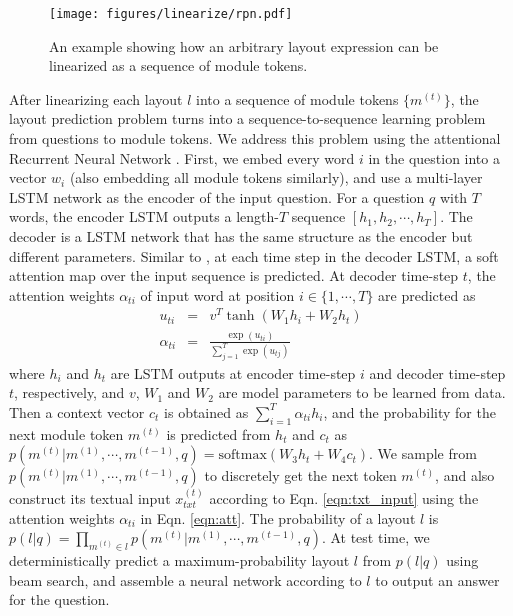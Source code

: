 \documentclass[10pt,twocolumn,letterpaper]{article}
\begin{document}
\begin{figure}[t]
\centering
\texttt{[image: figures/linearize/rpn.pdf]}\vspace{-0.2cm}
\caption{An example showing how an arbitrary layout expression can be linearized as a sequence of module tokens.}
\label{fig:linearize}
\vspace{-0.5cm}
\end{figure}

After linearizing each layout $l$ into a sequence of module tokens $\{m^{(t)}\}$, the layout prediction problem turns into a sequence-to-sequence learning problem from questions to module tokens. We address this problem using the attentional Recurrent Neural Network \cite{bahdanau2015neural}. First, we embed every word $i$ in the question into a vector $w_i$ (also embedding all module tokens similarly), and use a multi-layer LSTM network as the encoder of the input question. For a question $q$ with $T$ words, the encoder LSTM outputs a length-$T$ sequence $[h_1, h_2, \cdots, h_{T}]$. The decoder is a LSTM network that has the same structure as the encoder but different parameters. Similar to \cite{bahdanau2015neural}, at each time step in the decoder LSTM, a soft attention map over the input sequence is predicted. At decoder time-step $t$, the attention weights $\alpha_{ti}$ of input word at position $i \in \{1, \cdots, T\}$ are predicted as
\begin{eqnarray}
u_{ti} &=& v^T \tanh(W_1 h_i + W_2 h_t) \\
\alpha_{ti} &=& \frac{\exp(u_{ti})}{\sum_{j=1}^{T} \exp(u_{tj})} \label{eqn:att}
\end{eqnarray}
where $h_i$ and $h_t$ are LSTM outputs at encoder time-step $i$ and decoder time-step $t$, respectively, and $v$, $W_1$ and $W_2$ are model parameters to be learned from data. Then a context vector $c_t$ is obtained as $\sum_{i=1}^{T} \alpha_{ti} h_i$, and the probability for the next module token $m^{(t)}$ is predicted from $h_t$ and $c_t$ as
$
p(m^{(t)} | m^{(1)}, \cdots, m^{(t-1)}, q) = \mathrm{softmax}(W_3 h_t + W_4 c_t)
$.
We sample from $p(m^{(t)} | m^{(1)}, \cdots, m^{(t-1)}, q)$ to discretely get the next token $m^{(t)}$, and also construct its textual input $x_{txt}^{(t)}$ according to Eqn. \ref{eqn:txt_input} using the attention weights $\alpha_{ti}$ in Eqn. \ref{eqn:att}. The probability of a layout $l$ is
$
p(l | q) = \prod_{m^{(t)} \in l} p(m^{(t)} | m^{(1)}, \cdots, m^{(t-1)}, q)
$.
At test time, we deterministically predict a maximum-probability layout $l$ from $p(l | q)$ using beam search, and assemble a neural network according to $l$ to output an answer for the question.
\end{document}
